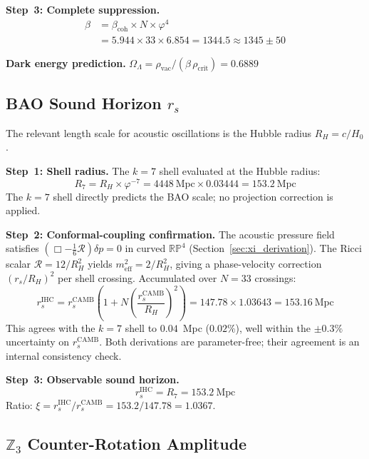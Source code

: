 \documentclass[12pt,a4paper]{article}
\begin{document}
\textbf{Step~3: Complete suppression.}
\begin{align}
  \beta &= \beta_\mathrm{coh} \times N \times \varphi^4 \\
        &= 5.944 \times 33 \times 6.854 = 1344.5 \approx 1345 \pm 50
\end{align}

\textbf{Dark energy prediction.}
$\Omega_\Lambda = \rho_\mathrm{vac} / (\beta\,\rho_\mathrm{crit}) = 0.6889$

\subsection{BAO Sound Horizon $r_s$}

The relevant length scale for acoustic oscillations is the Hubble radius
$R_H = c/H_0$.

\textbf{Step~1: Shell radius.} The $k = 7$ shell evaluated at the Hubble radius:
\begin{equation}
  R_7 = R_H \times \varphi^{-7} = 4448~\mathrm{Mpc} \times 0.03444 = 153.2~\mathrm{Mpc}
\end{equation}
The $k = 7$ shell directly predicts the BAO scale; no projection correction
is applied.

\textbf{Step~2: Conformal-coupling confirmation.}
The acoustic pressure field satisfies $(\Box - \frac{1}{6}\mathcal{R})\delta p = 0$
in curved $\mathbb{RP}^4$ (Section~\ref{sec:xi_derivation}). The Ricci scalar
$\mathcal{R} = 12/R_H^2$ yields $m_\mathrm{eff}^2 = 2/R_H^2$, giving a phase-velocity
correction $(r_s/R_H)^2$ per shell crossing. Accumulated over $N = 33$ crossings:
\begin{equation}
  r_s^\mathrm{IHC} = r_s^\mathrm{CAMB}\!\left(1 + N\!\left(\frac{r_s^\mathrm{CAMB}}{R_H}\right)^2\right)
  = 147.78 \times 1.03643 = 153.16~\mathrm{Mpc}
\end{equation}
This agrees with the $k=7$ shell to $0.04$~Mpc ($0.02\%$), well within the
$\pm 0.3\%$ uncertainty on $r_s^\mathrm{CAMB}$. Both derivations are
parameter-free; their agreement is an internal consistency check.

\textbf{Step~3: Observable sound horizon.}
\begin{equation}
  r_s^\mathrm{IHC} = R_7 = 153.2~\mathrm{Mpc}
\end{equation}
Ratio: $\xi = r_s^\mathrm{IHC}/r_s^\mathrm{CAMB} = 153.2/147.78 = 1.0367$.


\subsection{$\mathbb{Z}_3$ Counter-Rotation Amplitude}
\end{document}
